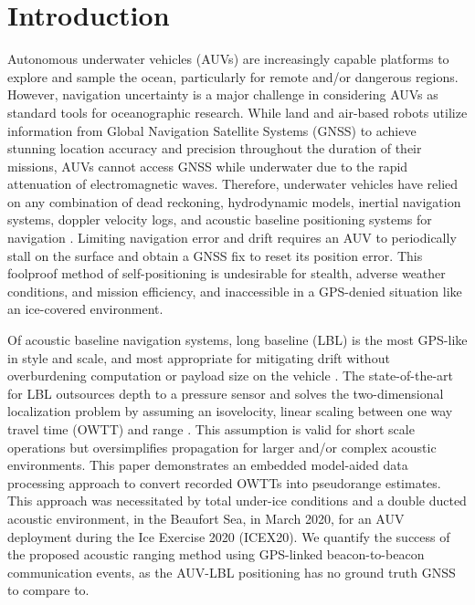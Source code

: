 
\section{Introduction}
\label{sec:1}  
Autonomous underwater vehicles (AUVs) are increasingly capable platforms to explore and sample the ocean, particularly for remote and/or dangerous regions.
However, navigation uncertainty is a major challenge in considering AUVs as standard tools for oceanographic research.
While land and air-based robots utilize information from Global Navigation Satellite Systems (GNSS) to achieve stunning location accuracy and precision throughout the duration of their missions, AUVs cannot access GNSS while underwater due to the rapid attenuation of electromagnetic waves.
Therefore, underwater vehicles have relied on any combination of dead reckoning, hydrodynamic models, inertial navigation systems, doppler velocity logs, and acoustic baseline positioning systems for navigation \citep{paull_auv_2014}.
Limiting navigation error and drift requires an AUV to periodically stall on the surface and obtain a GNSS fix to reset its position error.
This foolproof method of self-positioning is undesirable for stealth, adverse weather conditions, and mission efficiency, and inaccessible in a GPS-denied situation like an ice-covered environment.

Of acoustic baseline navigation systems, long baseline (LBL) is the most GPS-like in style and scale, and most appropriate for mitigating drift without overburdening computation or payload size on the vehicle \citep{paull_auv_2014,van_uffelen_global_2021}.
The state-of-the-art for LBL outsources depth to a pressure sensor and solves the two-dimensional localization problem by assuming an isovelocity, linear scaling between one way travel time (OWTT) and range \citep{eustice_recent_2006,eustice_experimental_2007,webster_preliminary_2009,webster_advances_2012}.
This assumption is valid for short scale operations but oversimplifies propagation for larger and/or complex acoustic environments.
This paper demonstrates an embedded model-aided data processing approach to convert recorded OWTTs into pseudorange estimates.
This approach was necessitated by total under-ice conditions and a double ducted acoustic environment, in the Beaufort Sea, in March 2020, for an AUV deployment during the Ice Exercise 2020 (ICEX20).
We quantify the success of the proposed acoustic ranging method using GPS-linked beacon-to-beacon communication events, as the AUV-LBL positioning has no ground truth GNSS to compare to.

